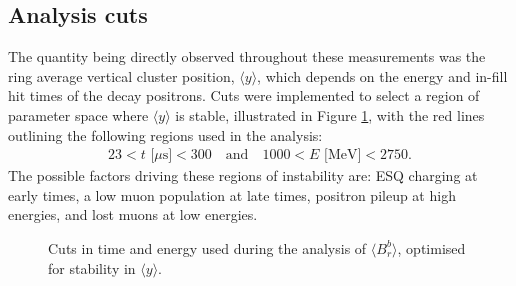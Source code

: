 \subsection{Analysis cuts}

The quantity being directly observed throughout these measurements was the ring average vertical cluster position, $\langle y \rangle$, which depends on the energy and in-fill hit times of the decay positrons. Cuts were implemented to select a region of parameter space where $\langle y \rangle$ is stable, illustrated in Figure \ref{fig:Cuts}, with the red lines outlining the following regions used in the analysis:
%
\begin{align*}
23 < t \text{ [$\mu$s]} < 300 \quad \text{and} \quad 1000 < E \text{ [MeV]} < 2750.
\end{align*}
%
The possible factors driving these regions of instability are: ESQ charging at early times, a low muon population at late times, positron pileup at high energies, and lost muons at low energies. 

\begin{figure}[t!]
\centering{}
\hfill
{}%
{}
\caption{Cuts in time and energy used during the analysis of $\langle B_{r}^{b} \rangle$, optimised for stability in $\langle y \rangle$.}
\label{fig:Cuts}
\end{figure}

